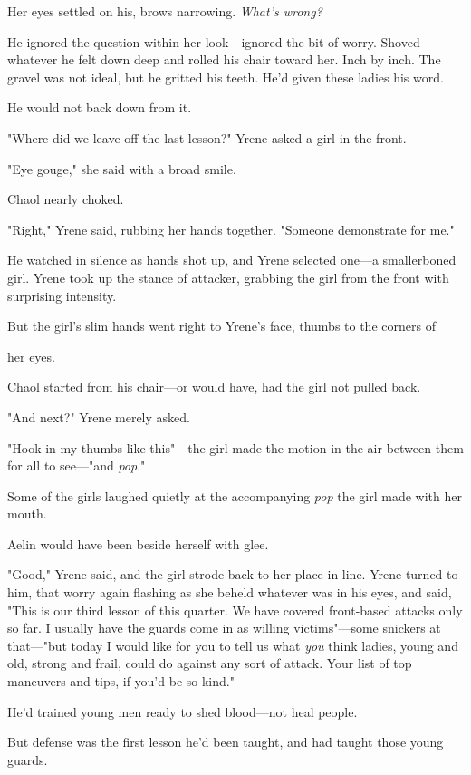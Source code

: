 Her eyes settled on his, brows narrowing. \emph{What's wrong?}

He ignored the question within her look---ignored the bit of worry. Shoved whatever he felt down deep and rolled his chair toward her. Inch by inch. The gravel was not ideal, but he gritted his teeth. He'd given these ladies his word.

He would not back down from it.

"Where did we leave off the last lesson?" Yrene asked a girl in the front.

"Eye gouge," she said with a broad smile.

Chaol nearly choked.

"Right," Yrene said, rubbing her hands together. "Someone demonstrate for me."

He watched in silence as hands shot up, and Yrene selected one---a smallerboned girl. Yrene took up the stance of attacker, grabbing the girl from the front with surprising intensity.

But the girl's slim hands went right to Yrene's face, thumbs to the corners of

her eyes.

Chaol started from his chair---or would have, had the girl not pulled back.

"And next?" Yrene merely asked.

"Hook in my thumbs like this"---the girl made the motion in the air between them for all to see---"and \emph{pop}."

Some of the girls laughed quietly at the accompanying \emph{pop} the girl made with her mouth.

Aelin would have been beside herself with glee.

"Good," Yrene said, and the girl strode back to her place in line. Yrene turned to him, that worry again flashing as she beheld whatever was in his eyes, and said, "This is our third lesson of this quarter. We have covered front-based attacks only so far. I usually have the guards come in as willing victims"---some snickers at that---"but today I would like for you to tell us what \emph{you} think ladies, young and old, strong and frail, could do against any sort of attack. Your list of top maneuvers and tips, if you'd be so kind."

He'd trained young men ready to shed blood---not heal people.

But defense was the first lesson he'd been taught, and had taught those young guards.


